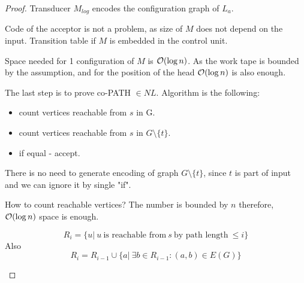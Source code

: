 \begin{proof}
	Transducer $M_{log}$ encodes the configuration graph of $L_a$.

	Code of the acceptor is not a problem, as size of $M$ does not depend on the input.
	Transition table if $M$ is embedded in the control unit.

	Space needed for 1 configuration of $M$ is $\mathcal{O}(\log n)$.
	As the work tape is bounded by the assumption, and for the position of the head $\mathcal{O}(\log n)$ is also enough.

	The last step is to prove co-PATH $\in NL$.
	Algorithm is the following:
	\begin{itemize}
		\item count vertices reachable from $s$ in G.
		\item count vertices reachable from $s$ in $G \setminus \{t\}$.
		\item if equal - accept.
	\end{itemize}

	There is no need to generate encoding of graph $G \setminus \{t\}$, since $t$ is part of input and we can ignore it by single "if".

	How to count reachable vertices? The number is bounded by $n$ therefore, $\mathcal{O}(\log n)$ space is enough.

	\begin{definition}[$R_i$]
		\[ R_i = \{ u |\ u\ \text{is reachable from}\ s\ \text{by path length}\ \leq i \} \]
		Also
		\[ R_i = R_{i - 1} \cup \{ a |\ \exists b \in R_{i - 1}: (a, b) \in E(G) \} \]
	\end{definition}


\end{proof}

